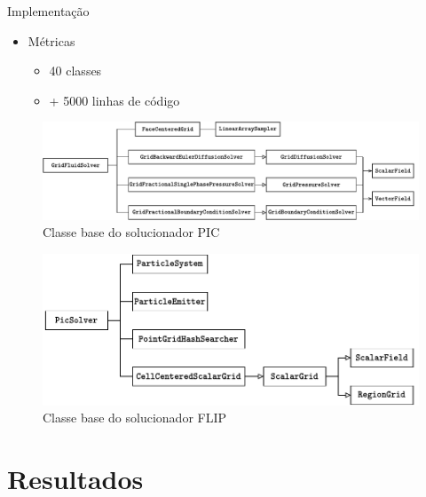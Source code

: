 \documentclass[aspectratio=169,xcolor=dvipsnames]{beamer}
\begin{document}
\begin{frame}{Implementação}
    \begin{itemize}
        \item Métricas
        \begin{itemize}
            \item 40 classes
            \item + 5000 linhas de código
        \end{itemize}
    \end{itemize}
    
    {
    \begin{figure}
        \centering
        \includegraphics[width=\linewidth]{figures/GridFluidSolveDiagram.pdf}
        \caption{Classe base do solucionador PIC}
        \label{fig:gridfluid}
    \end{figure}
    }
    
    {
    \begin{figure}
        \centering
        \includegraphics[width=0.8\linewidth]{figures/PicSolver.pdf}
        \caption{Classe base do solucionador FLIP}
        \label{fig:picsolver}
    \end{figure}
    }
\end{frame}


\section{Resultados}
\end{document}

